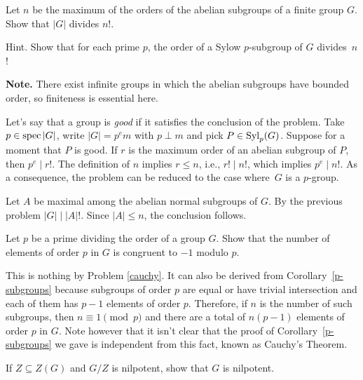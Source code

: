  \begin{probl}
     Let\/ $n$ be the maximum of the orders of the abelian subgroups of a finite group\/ $G$. Show that\/ $|G|$ divides\/ $n!$.
    
    \textrm{\rm Hint. Show that for each prime $p$, the order of a Sylow $p$-subgroup of $G$ divides~$n$!}

    \textrm{\rm {\bf Note.} There exist infinite groups in which the abelian subgroups have bounded order, so finiteness is essential here.}
 \end{probl}

\begin{solution} Let's say that a group is \textsl{good} if it satisfies the conclusion of the problem. Take $p\in\operatorname{spec}|G|$, write $|G|=p^em$ with $p\perp m$ and pick $P\in{\rm Syl}_p(G)$. Suppose for a moment that $P$ is good. If $r$ is the maximum order of an abelian subgroup of $P$, then $p^e\mid r!$. The definition of $n$ implies $r\le n$, i.e., $r!\mid n!$, which implies $p^e\mid n!$. As a consequence, the problem can be reduced to the case where~$G$ is a $p$-group.

Let $A$ be maximal among the abelian normal subgroups of $G$. By the previous problem $|G|\mid |A|!$. Since $|A|\le n$, the conclusion follows.  \end{solution}

\begin{probl}
    Let\/ $p$ be a prime dividing the order of a group\/ $G$. Show that the number of elements of order\/ $p$ in\/ $G$ is congruent to\/ $-1$ modulo\/ $p$.
\end{probl}

\begin{solution} This is nothing by Problem \ref{cauchy}. It can also be derived from Corollary~\ref{p-subgroups} because subgroups of order $p$ are equal or have trivial intersection and each of them has $p-1$ elements of order $p$. Therefore, if $n$ is the number of such subgroups, then $n\equiv1\pmod p$ and there are a total of $n(p-1)$ elements of order $p$ in $G$. Note however that it isn't clear that the proof of Corollary~\ref{p-subgroups} we gave is independent from this fact, known as Cauchy's Theorem.  \end{solution}

\begin{probl}\label{problem-1.D.13}
    If $Z \subseteq Z(G)$ and $G/Z$ is nilpotent, show that\/ $G$ is nilpotent.
\end{probl}

